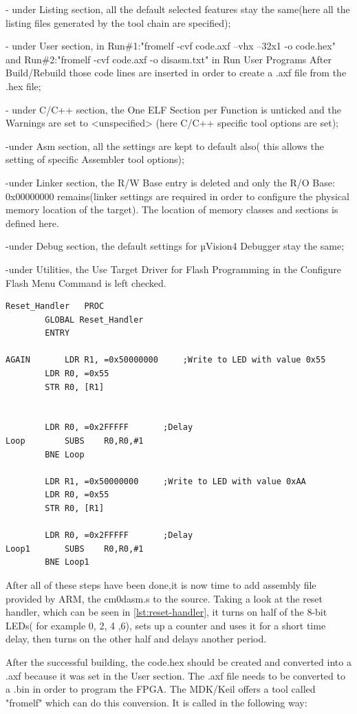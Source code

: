 - under Listing section, all the default selected features stay the same(here all the listing files generated by the tool chain are specified);

- under User section, in Run\#1:"fromelf -cvf code.axf --vhx --32x1 -o code.hex" and Run\#2:"fromelf -cvf code.axf -o disasm.txt" in Run User Programs After Build/Rebuild those code lines are inserted in order to create a .axf file from the .hex file;

- under C/C++ section, the One ELF Section per Function is unticked and the Warnings are set to <unspecified> (here C/C++ specific tool options are set);

-under Asm section, all the settings are kept to default also( this allows the setting of specific Assembler tool options);

-under Linker section, the R/W Base entry is deleted and only the R/O Base: 0x00000000 remains(linker settings are required in order to configure the physical memory location of the target). The location of memory classes and sections is defined here.

-under Debug section, the default settings for µVision4 Debugger stay the same;

-under Utilities, the Use Target Driver for Flash Programming in the Configure Flash Menu Command is left checked.

\begin{lstlisting}[caption={Reset Handler},label={lst:reset-handler}]
Reset_Handler	PROC
		GLOBAL Reset_Handler
		ENTRY

AGAIN		LDR	R1, =0x50000000		;Write to LED with value 0x55
		LDR	R0, =0x55
		STR	R0, [R1]


		LDR	R0, =0x2FFFFF		;Delay
Loop		SUBS	R0,R0,#1
		BNE Loop

		LDR	R1, =0x50000000		;Write to LED with value 0xAA
		LDR	R0, =0x55
		STR	R0, [R1]

		LDR	R0, =0x2FFFFF		;Delay
Loop1		SUBS	R0,R0,#1
		BNE Loop1
\end{lstlisting}

After all of these steps have been done,it is now time to add assembly file provided by ARM, the cm0dasm.s to the source. Taking a look at the reset handler, which can be seen in \ref{lst:reset-handler}, it turns on half of the 8-bit LEDs( for example 0, 2, 4 ,6), sets up a counter and uses it for a short time delay, then turns on the other half and delays another period.

After the successful building, the code.hex should be created and converted into a .axf because it was set in the User section. The .axf file needs to be converted to a .bin in order to program the FPGA. The MDK/Keil offers a tool called "fromelf" which can do this conversion. It is called in the following way:

